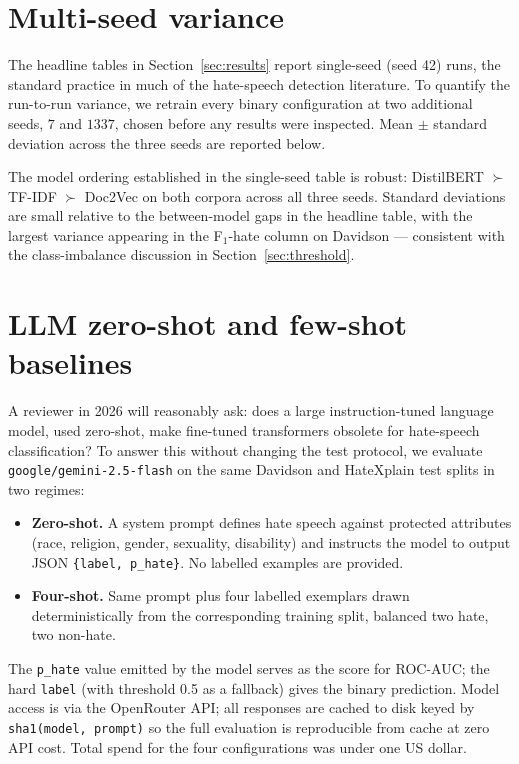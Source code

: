 \documentclass[11pt]{article}
\begin{document}
\section{Multi-seed variance}
\label{app:seeds}

The headline tables in Section~\ref{sec:results} report single-seed
(seed 42) runs, the standard practice in much of the hate-speech detection
literature. To quantify the run-to-run variance, we retrain every binary
configuration at two additional seeds, $7$ and $1337$, chosen before any
results were inspected. Mean $\pm$ standard deviation across the three
seeds are reported below.



The model ordering established in the single-seed table is robust:
DistilBERT $\succ$ TF-IDF $\succ$ Doc2Vec on both corpora across all
three seeds. Standard deviations are small relative to the
between-model gaps in the headline table, with the largest variance
appearing in the F$_1$-hate column on Davidson --- consistent with the
class-imbalance discussion in Section~\ref{sec:threshold}.

\section{LLM zero-shot and few-shot baselines}
\label{app:llm}

A reviewer in 2026 will reasonably ask: does a large instruction-tuned
language model, used zero-shot, make fine-tuned transformers obsolete
for hate-speech classification? To answer this without changing the
test protocol, we evaluate \texttt{google/gemini-2.5-flash} on the same
Davidson and HateXplain test splits in two regimes:

\begin{itemize}
  \item \textbf{Zero-shot.} A system prompt defines hate speech against
        protected attributes (race, religion, gender, sexuality,
        disability) and instructs the model to output JSON
        \texttt{\{label, p\_hate\}}. No labelled examples are provided.
  \item \textbf{Four-shot.} Same prompt plus four labelled exemplars
        drawn deterministically from the corresponding training split,
        balanced two hate, two non-hate.
\end{itemize}

The \texttt{p\_hate} value emitted by the model serves as the score for
ROC-AUC; the hard \texttt{label} (with threshold 0.5 as a fallback)
gives the binary prediction. Model access is via the OpenRouter API;
all responses are cached to disk keyed by \texttt{sha1(model, prompt)}
so the full evaluation is reproducible from cache at zero API cost.
Total spend for the four configurations was under one US dollar.
\end{document}
